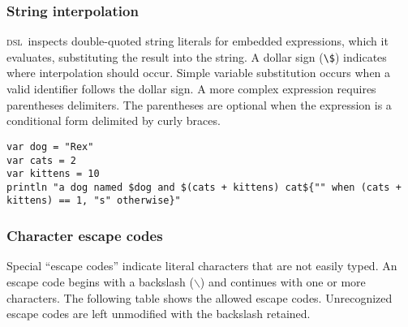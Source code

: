\documentclass[11pt]{article}
\newcommand{\DSL}{{\scshape dsl}}
\newcommand{\literal}[1]{\lstinline[style=DSL,identifierstyle=\itshape]!#1!}
\begin{document}
\subsubsection{String interpolation}

\DSL\ inspects double-quoted string literals for embedded expressions, which it evaluates, substituting the result into the string.
A dollar sign (\literal{\$}) indicates where interpolation should occur.
Simple variable substitution occurs when a valid identifier follows the dollar sign.
A more complex expression requires parentheses delimiters.
The parentheses are optional when the expression is a conditional form delimited by curly braces.

\begin{lstlisting}
var dog = "Rex"
var cats = 2
var kittens = 10
println "a dog named $dog and $(cats + kittens) cat${"" when (cats + kittens) == 1, "s" otherwise}"
\end{lstlisting}

\subsubsection{Character escape codes}

Special ``escape codes'' indicate literal characters that are not easily typed.
An escape code begins with a backslash ($\backslash$) and continues with one or more characters.
The following table shows the allowed escape codes. 
Unrecognized escape codes are left unmodified with the backslash retained.
\end{document}
